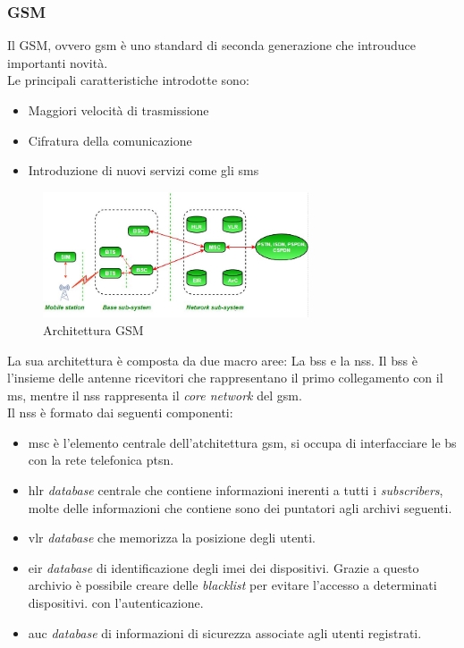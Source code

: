 \subsubsection{GSM}
Il GSM, ovvero \gls{gsm}\cite{gsm} è uno standard di seconda generazione che introuduce importanti novità.\\
Le principali caratteristiche introdotte sono:
\begin{itemize}
    \item Maggiori velocità di trasmissione
    \item Cifratura della comunicazione
    \item Introduzione di nuovi servizi come gli \gls{sms}
\end{itemize}
\begin{figure}[ht]
    \centering
    \includegraphics[width=0.7\textwidth]{images/2g-gsm.jpg}
    \caption{Architettura GSM}
\end{figure}
La sua architettura è composta da due macro aree: La \gls{bss} e la \gls{nss}.
Il \gls{bss} è l'insieme delle antenne ricevitori che rappresentano il primo collegamento con il \gls{ms}, mentre il \gls{nss} rappresenta il \textit{core network} del \gls{gsm}.\\
Il \gls{nss} è formato dai seguenti componenti:
\begin{itemize}
    \item \gls{msc} è l'elemento centrale dell'atchitettura \gls{gsm}, si occupa di interfacciare le \gls{bs} con la rete telefonica \gls{ptsn}.
    \item \gls{hlr} \textit{database} centrale che contiene informazioni inerenti a tutti i \textit{subscribers}, molte delle informazioni
    che contiene sono dei puntatori agli archivi seguenti.
    \item \gls{vlr} \textit{database} che memorizza la posizione degli utenti.
    \item \gls{eir} \textit{database} di identificazione degli \gls{imei} dei dispositivi. Grazie a questo archivio è possibile creare delle \textit{blacklist}
    per evitare l'accesso a determinati dispositivi.
    con l'autenticazione.
    \item \gls{auc} \textit{database} di informazioni di sicurezza associate agli utenti registrati.
\end{itemize}

